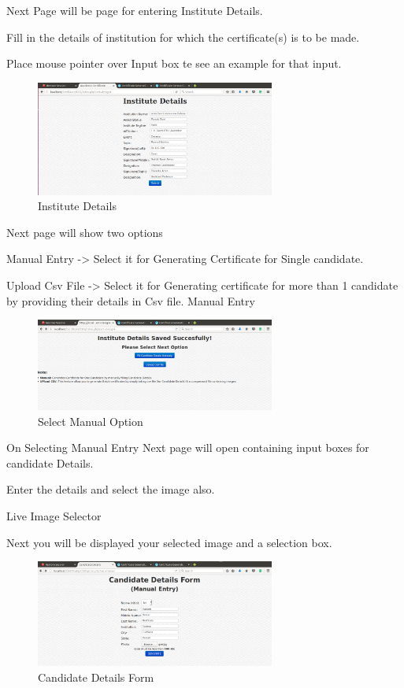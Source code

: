     Next Page will be page for entering Institute Details.


    Fill in the details of institution for which the certificate(s) is to be made.

    Place mouse pointer over Input box te see an example for that input.
\begin{figure}[!ht]
\centering
\includegraphics[width=0.7\textwidth]{input/images/cgs/cgs2.png}                  
\caption{Institute Details}
\hspace{-1.5em}
\end{figure}


    Next page will show two options

    Manual Entry -> Select it for Generating Certificate for Single candidate.

    Upload Csv File -> Select it for Generating certificate for more than 1 candidate by providing their details in Csv file.
    Manual Entry
\begin{figure}[!ht]
\centering
\includegraphics[width=0.7\textwidth]{input/images/cgs/cgs3.png}                  
\caption{Select Manual Option}
\hspace{-1.5em}
\end{figure}

    On Selecting Manual Entry Next page will open containing input boxes for candidate Details.

    Enter the details and select the image also.

    Live Image Selector

    Next you will be displayed your selected image and a selection box.

\begin{figure}[!ht]
\centering
\includegraphics[width=0.7\textwidth]{input/images/cgs/cgs4.png}                  
\caption{Candidate Details Form}
\hspace{-1.5em}
\end{figure}

